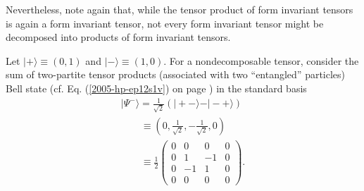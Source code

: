 Nevertheless, note again that, while the tensor product of form invariant tensors is again a form invariant tensor,  not every form
invariant tensor might be decomposed into products of form invariant tensors.

{
\color{blue}
\bexample
Let
$\vert + \rangle  \equiv   (0,1)$
and
$\vert - \rangle  \equiv   (1,0)$.
For a nondecomposable tensor, consider the sum of two-partite tensor products (associated with two ``entangled'' particles)
Bell state (cf. Eq. (\ref{2005-hp-ep12s1v}) on page \pageref{2005-hp-ep12s1v}) in the standard basis     
\begin{equation}
\begin{split}
\vert \Psi^-\rangle = \frac{1}{\sqrt{2}}\left(\vert +-\rangle   - \vert -+\rangle  \right)   \\
\qquad \equiv  \left( 0,\frac{1}{\sqrt{2}},- \frac{1}{\sqrt{2}} ,  0 \right)     \\
\qquad \equiv  \frac{1}{2}
\begin{pmatrix}
0&0&0&0\\
0&1&-1&0\\
0&-1&1&0\\
0&0&0&0
\end{pmatrix}
.
\end{split}
\label{2011-m-bellstatenondec}
\end{equation}

}
